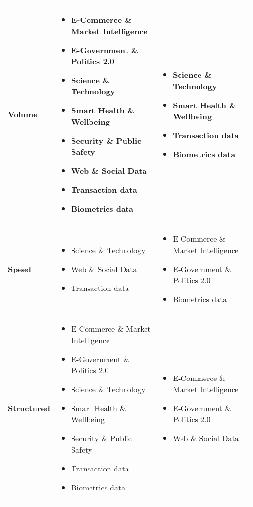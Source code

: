 \begin{table}[H]
\begin{tabular}{ | p{2.2cm} | p{5.8cm} | p{5.8cm} | }
\textbf{Volume}              &
\begin{itemize}[leftmargin=*]
  \item E-Commerce \& Market Intelligence
  \item E-Government \& Politics 2.0
  \item Science \& Technology
  \item Smart Health \& Wellbeing
  \item Security \& Public Safety
  \item Web \& Social Data
  \item Transaction data
  \item Biometrics data
\end{itemize}
&
\begin{itemize}[leftmargin=*]
  \item Science \& Technology
  \item Smart Health \& Wellbeing
  \item Transaction data
  \item Biometrics data
\end{itemize}
\\ \hline

\textbf{Speed}               &
\begin{itemize}[leftmargin=*]
  \item Science \& Technology
  \item Web \& Social Data
  \item Transaction data
\end{itemize}
&
\begin{itemize}[leftmargin=*]
  \item E-Commerce \& Market Intelligence
  \item E-Government \& Politics 2.0
  \item Biometrics data
\end{itemize}
\\ \hline

\textbf{Structured}          &
\begin{itemize}[leftmargin=*]
  \item E-Commerce \& Market Intelligence
  \item E-Government \& Politics 2.0
  \item Science \& Technology
  \item Smart Health \& Wellbeing
  \item Security \& Public Safety
  \item Transaction data
  \item Biometrics data
\end{itemize}
&
\begin{itemize}[leftmargin=*]
  \item E-Commerce \& Market Intelligence
  \item E-Government \& Politics 2.0
  \item Web \& Social Data
\end{itemize}
\\ \hline

\end{tabular}
\end{table}
